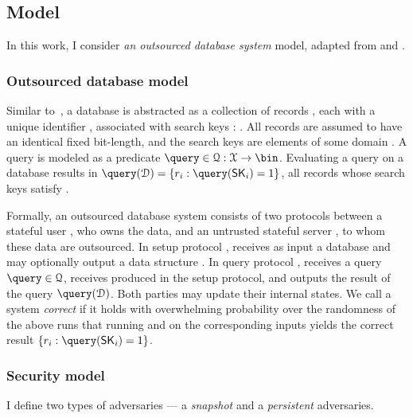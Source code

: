 		\subsection{Model}\label{section:proposal:intro:model}

			In this work, I consider \emph{an outsourced database system} model, adapted from \cite{generic-attacks-kellaris} and \cite{epsolute}.

			\subsubsection{Outsourced database model}

				Similar to~\cite{epsolute}, a database is abstracted as a collection of \dataSize{} records \record{}, each with a unique identifier \recordID{}, associated with search keys \searchKey{}: \databaseDef{}.
				All records are assumed to have an identical fixed bit-length, and the search keys are elements of some domain \searchKeyDomain{}.
				A query is modeled as a predicate $\query \in \querySet: \searchKeyDomain \to \bin$.
				Evaluating a query \query{} on a database \database{} results in $\query( \database ) = \{ \record_i : \query( \searchKey_i ) = 1 \}$, all records whose search keys satisfy \query{}.

				Formally, an outsourced database system consists of two protocols between a stateful user \user{}, who owns the data, and an untrusted stateful server \server{}, to whom these data are outsourced.
				In setup protocol \protocolSetup{}, \user{} receives as input a database \databaseDef{} and \server{} may optionally output a data structure \serverDS{}.
				In query protocol \protocolQuery{}, \user{} receives a query $\query \in \querySet$, \server{} receives \serverDS{} produced in the setup protocol, and \user{} outputs the result of the query $\query( \database )$.
				Both parties may update their internal states.
				We call a system \emph{correct} if it holds with overwhelming probability over the randomness of the above runs that running \protocolSetup{} and  \protocolQuery{} on the corresponding inputs yields the correct result $\{ \record_i : \query( \searchKey_i ) = 1 \}$.

			\subsubsection{Security model}

				I define two types of adversaries --- a \emph{snapshot} and a \emph{persistent} adversaries.

